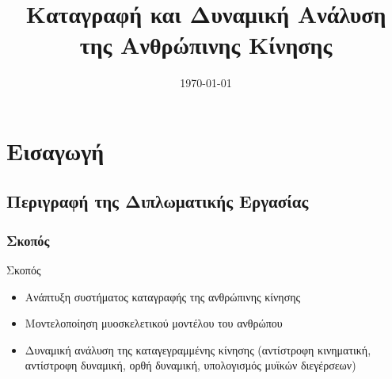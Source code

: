 \documentclass[8pt,sans,mathserif]{beamer}%
\title[Καταγραφή και Δυναμική Ανάλυση της Ανθρώπινης Κίνησης]{Καταγραφή και Δυναμική Ανάλυση της Ανθρώπινης Κίνησης}
\institute[ΗΜ\&ΤΥ]{
{\large\textsc{Πανεπιστήμιο Πατρών \\
Τμήμα Ηλεκτρολόγων Μηχανικών και Τεχνολογίας Υπολογιστών}}\\[1cm]
{\large\eng{Stanev Dimitar}}\\
\medskip
\textit{\eng{jimstanev@gmail.com}} %
}
\date{\today} %
\begin{document}

\begin{frame}
\titlepage %
\end{frame}


%


\section{Εισαγωγή}
\frame{\tableofcontents[currentsection]}
\subsection{Περιγραφή της Διπλωματικής Εργασίας}
\begin{frame}
\frametitle{Σκοπός}

    \begin{block}{Σκοπός}
        \begin{itemize}
            \item Ανάπτυξη συστήματος καταγραφής της ανθρώπινης κίνησης
            \item Μοντελοποίηση μυοσκελετικού μοντέλου του ανθρώπου
            \item Δυναμική ανάλυση της καταγεγραμμένης κίνησης (αντίστροφη κινηματική, αντίστροφη δυναμική, ορθή δυναμική, υπολογισμός μυϊκών διεγέρσεων)
        \end{itemize}
    \end{block}

\end{frame}
\end{document}
